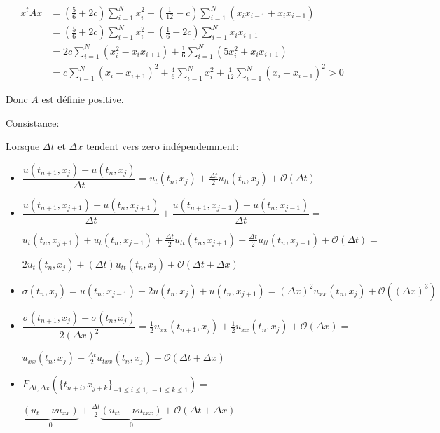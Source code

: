 \documentclass[10pt,a4paper,oneside]{article}
\begin{document}
\begin{enumerate}
\begin{align*}
x^t A x &= (\frac{5}{6} + 2c)\sum_{i = 1}^N x_i^2 + (\frac{1}{12} - c)\sum_{i = 1}^N (x_i x_{i - 1} + x_i x_{i + 1}) \\
&= (\frac{5}{6} + 2c)\sum_{i = 1}^N x_i^2 + (\frac{1}{6} - 2c)\sum_{i = 1}^N x_i x_{i + 1} \\
&= 2c \sum_{i = 1}^N (x_i^2 - x_i x_{i + 1}) + \frac{1}{6} \sum_{i = 1}^N (5x_i^2 + x_i x_{i + 1}) \\
&= c \sum_{i = 1}^N(x_i - x_{i + 1})^2 + \frac{4}{6} \sum_{i = 1}^N x_i^2 + \frac{1}{12} \sum_{i = 1}^N (x_i + x_{i + 1})^2 > 0
\end{align*}

Donc $A$ est définie positive.

\underline{Consistance}:

Lorsque $\Delta t$ et $\Delta x$ tendent vers zero indépendemment:

\begin{itemize}
\item
$\dfrac{u(t_{n + 1},x_j) - u(t_n,x_j)}{\Delta t} = u_t(t_n,x_j) + \frac{\Delta t}{2}u_{tt}(t_n,x_j) + \mathcal{O}(\Delta t)$

\item
$\dfrac{u(t_{n + 1},x_{j + 1}) - u(t_n,x_{j + 1})}{\Delta t} + \dfrac{u(t_{n + 1},x_{j - 1}) - u(t_n,x_{j - 1})}{\Delta t} =$

$u_t(t_n,x_{j + 1}) + u_t(t_n,x_{j - 1}) + \frac{\Delta t}{2}u_{tt}(t_n,x_{j + 1}) + \frac{\Delta t}{2}u_{tt}(t_n,x_{j - 1}) + \mathcal{O}(\Delta t) =$

$2u_t(t_n,x_j) + (\Delta t) u_{tt}(t_n,x_j) + \mathcal{O}(\Delta t + \Delta x)$

\item
$\sigma(t_n,x_j) = u(t_n,x_{j - 1}) - 2u(t_n,x_j) + u(t_n,x_{j + 1}) = (\Delta x)^2 u_{xx}(t_n,x_j) + \mathcal{O}((\Delta x)^3)$

\item
$\dfrac{\sigma(t_{n + 1},x_j) + \sigma(t_n,x_j)}{2(\Delta x)^2} = \frac{1}{2}u_{xx}(t_{n + 1},x_j) + \frac{1}{2}u_{xx}(t_n,x_j) + \mathcal{O}(\Delta x) =$

$u_{xx}(t_n,x_j) + \frac{\Delta t}{2}u_{txx}(t_n,x_j) + \mathcal{O}(\Delta t + \Delta x)$

\item
$F_{\Delta t, \Delta x}(\{ t_{n + i},x_{j + k} \}_{-1 \leq i \leq 1,\ -1 \leq k \leq 1}) =$

$\underbrace{(u_t - \nu u_{xx})}_{0} + \frac{\Delta t}{2}\underbrace{(u_{tt} - \nu u_{txx})}_{0} + \mathcal{O}(\Delta t + \Delta x)$


\end{itemize}
\end{enumerate}
\end{document}
